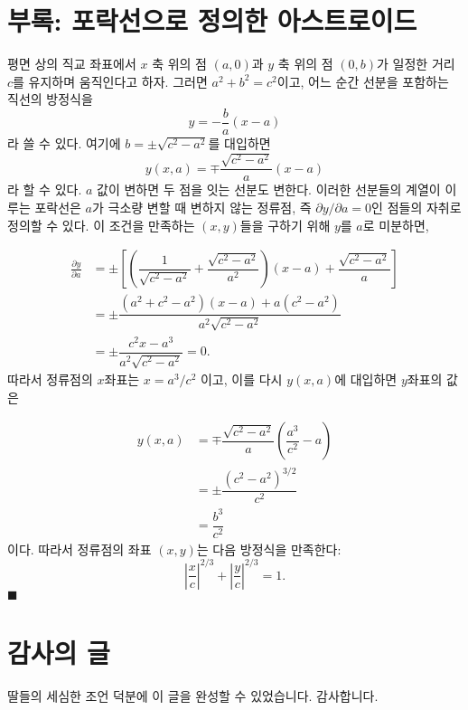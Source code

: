 \documentclass[twocolumn]{article}
\begin{document}
\appendix
\newcommand{\pd}[2]{{\frac{\partial #1}{\partial #2}}}
\newcommand{\ilpd}[2]{{{\partial #1}/{\partial #2}}}
\section*{부록: 포락선으로 정의한 아스트로이드}
평면 상의 직교 좌표에서 $x$ 축 위의 점  $(a, 0)$과 $y$ 축 위의 점 $(0, b)$가 일정한 거리 $c$를 유지하며 움직인다고 하자. 그러면 $a^2+b^2=c^2$이고, 어느 순간 선분을 포함하는 직선의 방정식을 
$$y=-\dfrac{b}{a}(x-a)$$
라 쓸 수 있다. 여기에 
$b=\pm \sqrt{c^2-a^2}$를 대입하면 
$$y(x, a) = \mp \dfrac{\sqrt{c^2-a^2}}{a}(x-a)$$
라 할 수 있다. 
$a$ 값이 변하면 두 점을 잇는 선분도 변한다. 이러한 선분들의 계열이 이루는 포락선은 $a$가 극소량 변할 때 변하지 않는 정류점, 즉
$\ilpd{y}{a} = 0$인 점들의 자취로 정의할 수 있다. 이 조건을 만족하는 $(x, y)$들을 구하기 위해 $y$를 $a$로 미분하면,

$$ \begin{aligned}
\pd{y}{a} &= \pm\left[\left( \dfrac{1}{\sqrt{c^2-a^2}}+\dfrac{\sqrt{c^2-a^2}}{a^2}\right) (x-a) + \dfrac{\sqrt{c^2-a^2}}{a} \right]\\
	&= \pm \dfrac{(a^2+c^2-a^2)(x-a)+a(c^2-a^2)}{a^2\sqrt{c^2-a^2}}\\
	&= \pm \dfrac{c^2 x - a^3}{a^2 \sqrt{c^2 - a^2}} = 0.
\end{aligned}
$$
따라서 정류점의 $x$좌표는 $x = a^3/c^2$ 이고, 이를 다시 $y(x, a)$에 대입하면 $y$좌표의 값은

$$ \begin{aligned}
y(x, a) &= \mp \dfrac{\sqrt{c^2-a^2}}{a}\left(\dfrac{a^3}{c^2}-a\right)\\
	& = \pm \dfrac{\left( c^2- a^2 \right)^{3/2}}{c^2}\\
	& = \dfrac{b^3}{c^2}
\end{aligned}
$$
이다. 따라서 정류점의 좌표 $(x, y)$는 다음 방정식을 만족한다:
$$ \left|\dfrac{x}{c}\right|^{2/3} + \left|\dfrac{y}{c}\right|^{2/3} = 1. $$
$\blacksquare$

\section*{감사의 글}
딸들의 세심한 조언 덕분에 이 글을 완성할 수 있었습니다. 감사합니다.
\end{document}
